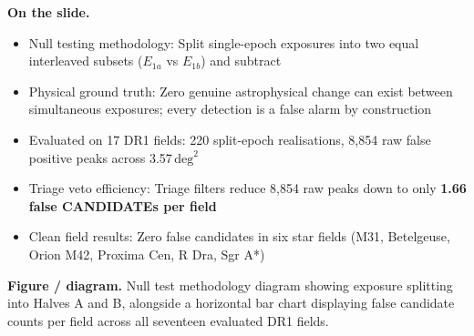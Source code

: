 \documentclass[11pt,a4paper]{article}
\begin{document}
\textbf{On the slide.}
\begin{itemize}[leftmargin=1.4em,itemsep=1.5pt,topsep=1.5pt]
\item Null testing methodology: Split single-epoch exposures into two equal interleaved subsets ($E_{1a}$ vs $E_{1b}$) and subtract
\item Physical ground truth: Zero genuine astrophysical change can exist between simultaneous exposures; every detection is a false alarm by construction
\item Evaluated on 17 DR1 fields: 220 split-epoch realisations, 8,854 raw false positive peaks across 3.57\,$\mathrm{deg}^2$
\item Triage veto efficiency: Triage filters reduce 8,854 raw peaks down to only \textbf{1.66 false CANDIDATEs per field}
\item Clean field results: Zero false candidates in six star fields (M31, Betelgeuse, Orion M42, Proxima Cen, R Dra, Sgr A*)
\end{itemize}

\textbf{Figure / diagram.} Null test methodology diagram showing exposure splitting into Halves A and B, alongside a horizontal bar chart displaying false candidate counts per field across all seventeen evaluated DR1 fields.
\end{document}
